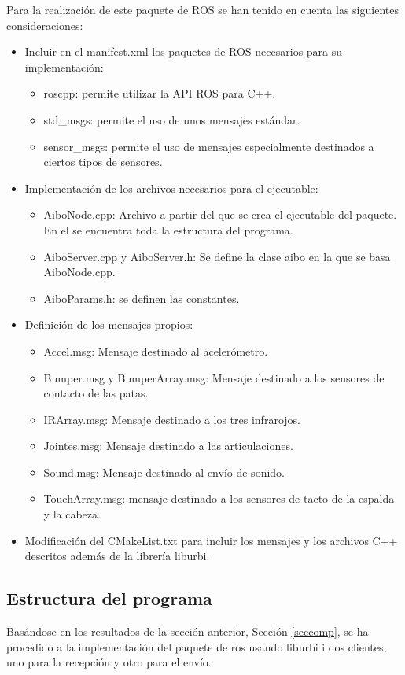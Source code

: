 \documentclass[12pt,a4paper,final,twoside]{book}
\begin{document}
Para la realización de este paquete de ROS se han tenido en cuenta las siguientes consideraciones:
\begin{itemize}
\item Incluir en el manifest.xml los paquetes de ROS necesarios para su implementación:
\begin{itemize}
\item roscpp: permite utilizar la API ROS para C++.
\item std{\_}msgs: permite el uso de unos mensajes estándar.
\item sensor{\_}msgs: permite el uso de mensajes especialmente destinados a ciertos tipos de sensores.
\end{itemize}
\item Implementación de los archivos necesarios para el ejecutable:
\begin{itemize}
\item AiboNode.cpp: Archivo a partir del que se crea el ejecutable del paquete. En el se encuentra toda la estructura del programa.
\item AiboServer.cpp y AiboServer.h: Se define la clase aibo en la que se basa AiboNode.cpp.
\item AiboParams.h: se definen las constantes.
\end{itemize} 
\item Definición de los mensajes propios:
\begin{itemize}
\item Accel.msg: Mensaje destinado al acelerómetro.
\item Bumper.msg y BumperArray.msg: Mensaje destinado a los sensores de contacto de las patas.
\item IRArray.msg: Mensaje destinado a los tres infrarojos.
\item Jointes.msg: Mensaje destinado a las articulaciones.
\item Sound.msg: Mensaje destinado al envío de sonido.
\item TouchArray.msg: mensaje destinado a los sensores de tacto de la espalda y la cabeza.
\end{itemize}
\item Modificación del CMakeList.txt para incluir los mensajes y los archivos C++ descritos además de la librería liburbi.
\end{itemize}

\subsection{Estructura del programa}
Basándose en los resultados de la sección anterior, Sección \ref{seccomp}, se ha procedido a la implementación del paquete de ros usando liburbi i dos clientes, uno para la recepción  y otro para el envío.
\end{document}
